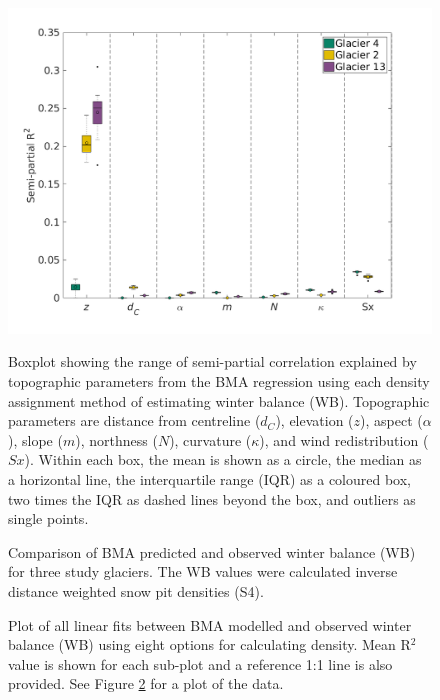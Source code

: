 \documentclass{sfuthesis}
\newcommand{\params}{Topographic parameters are distance from centreline ($d_C$), elevation ($z$), aspect ($\alpha$), slope ($m$), northness ($N$), curvature ($\kappa$), and wind redistribution ($Sx$). }
\newcommand{\boxplot}{Within each box, the mean is shown as a circle, the median as a horizontal line, the interquartile range (IQR) as a coloured box, two times the IQR as dashed lines beyond the box, and outliers as single points. }
\begin{document}
\begin{figure}[H]
	\centering
	\includegraphics[width =1.1 \textwidth]{BMSsemiR2_DensityOpts.png}\\
	\caption{Boxplot showing the range of semi-partial correlation explained by topographic parameters from the BMA regression using each density assignment method of estimating winter balance (WB). \params \boxplot }
	\label{fig:BMAsemiR2_densityOptions}
\end{figure} 
 
\begin{figure}[H]
	\caption{Comparison of BMA predicted and observed winter balance (WB) for three study glaciers. The WB values were calculated inverse distance weighted snow pit densities (S4).}
	\label{fig:BMSfit_opt8}
\end{figure}

\begin{figure}[H]
	\caption{Plot of all linear fits between BMA modelled and observed winter balance (WB) using eight options for calculating density. Mean R$^2$ value is shown for each sub-plot and a reference 1:1 line is also provided. See Figure \ref{fig:BMSfit_opt8} for a plot of the data. }
	\label{fig:BMSfit_allLines}
\end{figure}
\end{document}
